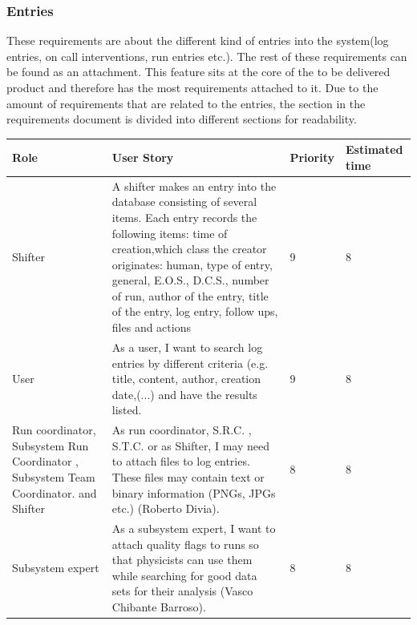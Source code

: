 \documentclass[paper=a4, fontsize=11pt,twoside]{scrartcl}	%
\begin{document}
\subsubsection{Entries}
These requirements are about the different kind of entries into the system(log entries, on call interventions, run entries etc.). The rest of these requirements can be found as an attachment. This feature sits at the core of the to be delivered product and therefore has the most requirements attached to it. Due to the amount of requirements that are related to the entries, the section in the requirements document is divided into different sections for readability.

\begin{longtable}{ | p{3cm} | p{8cm} | p{1.5cm} | l |}
\hline
Role & User Story & Priority & Estimated time \\ \hline
Shifter &  A shifter makes an entry into the database consisting of several items. Each entry records the following items: time of creation,which class the creator originates: human, type of entry, general, E.O.S., D.C.S., number of run, author of the entry, title of the entry, log entry, follow ups, files and actions & 9 & 8 \\ \hline
User & As a user, I want to search log entries by different criteria (e.g. title, content, author, creation date,(...) and have the results listed. & 9 & 8 \\ \hline
Run coordinator, Subsystem Run Coordinator , Subsystem Team Coordinator. and Shifter& As run coordinator, S.R.C. , S.T.C. or as Shifter, I may need to attach files to log entries. These files may contain text or binary information (PNGs, JPGs etc.) (Roberto Divia). & 8 & 8 \\ \hline
Subsystem expert & As a subsystem expert, I want to attach quality flags to runs so that
physicists can use them while searching for good data sets for their analysis (Vasco Chibante Barroso). & 8 & 8 \\ \hline
\end{longtable}
\end{document}
